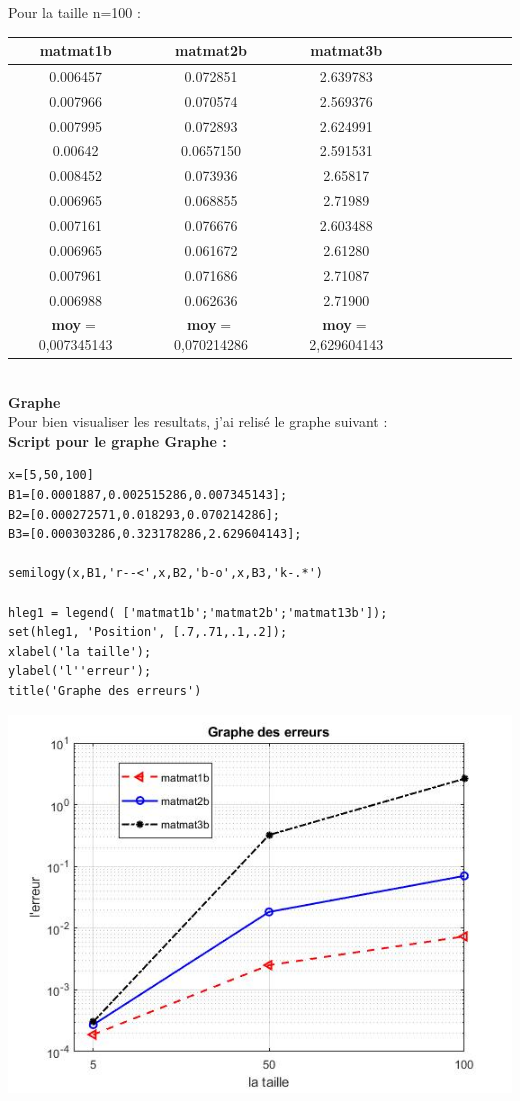\documentclass[12pt]{report}
\begin{document}
Pour la taille n=100 :\\


\begin{tabular}{|*{10}{c|}}
	\hline
	\textbf{matmat1b}  & \textbf{matmat2b}  & \textbf{matmat3b}\\
	\hline
	0.006457  & 0.072851  & 2.639783   \\
	\hline
	0.007966  & 0.070574  & 2.569376   \\
	\hline
	0.007995  & 0.072893  & 2.624991   \\
	\hline
	0.00642  & 0.0657150  & 2.591531   \\
	\hline
	0.008452  & 0.073936  & 2.65817  \\
	\hline
	0.006965  & 0.068855  & 2.71989   \\
	\hline
	0.007161  & 0.076676  & 2.603488   \\
	\hline
	0.006965  & 0.061672  & 2.61280   \\
	\hline
	0.007961  & 0.071686  & 2.71087   \\
	\hline
	0.006988  & 0.062636  & 2.71900   \\
	\hline
	\textbf{moy}$=$ 0,007345143  & \textbf{moy}$=$ 0,070214286  & \textbf{moy}$=$ 2,629604143   \\
	\hline
	
\end{tabular}\\[1cm]
\textbf{Graphe}\\

Pour bien visualiser les resultats, j'ai relisé le graphe suivant :\\[0.5cm]
\textbf{Script pour le graphe Graphe :}
\begin{lstlisting}[]
x=[5,50,100]
B1=[0.0001887,0.002515286,0.007345143];
B2=[0.000272571,0.018293,0.070214286];
B3=[0.000303286,0.323178286,2.629604143];

semilogy(x,B1,'r--<',x,B2,'b-o',x,B3,'k-.*')

hleg1 = legend( ['matmat1b';'matmat2b';'matmat13b']);
set(hleg1, 'Position', [.7,.71,.1,.2]);
xlabel('la taille');
ylabel('l''erreur');
title('Graphe des erreurs')
\end{lstlisting}

\includegraphics[scale=0.60]{graphe.jpg}~\\
\end{document}
